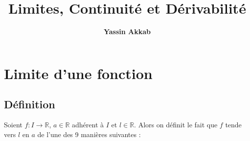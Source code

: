 \documentclass{article}
\title{\textbf{Limites, Continuité et Dérivabilité}}
\author{\textbf{Yassin Akkab}}
\begin{document}
	
	\maketitle
	
	
	
	\tableofcontents
	
	\newpage
	\section{Limite d’une fonction}
	\subsection{Définition}
		Soient $f : I \to \mathbb{R}$, $a \in \mathbb{R}$ adhérent à $I$ et $l \in \mathbb{R}$. Alors on définit le fait que $f$ tende vers $l$ en $a$ de l’une des 9 manières suivantes :
\end{document}
